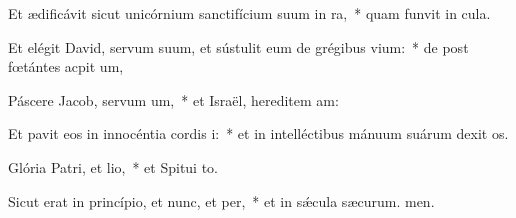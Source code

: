 \item Et ædificávit sicut unicórnium sanctifícium suum in ra,~* quam funvit in cula.
\item Et elégit David, servum suum, et sústulit eum de grégibus vium:~* de post fœtántes acpit um,
\item Páscere Jacob, servum um,~* et Israël, hereditem am:
\item Et pavit eos in innocéntia cordis i:~* et in intelléctibus mánuum suárum dexit os.
\item Glória Patri, et lio,~* et Spitui to.
\item Sicut erat in princípio, et nunc, et per,~* et in sǽcula sæcurum. men.
